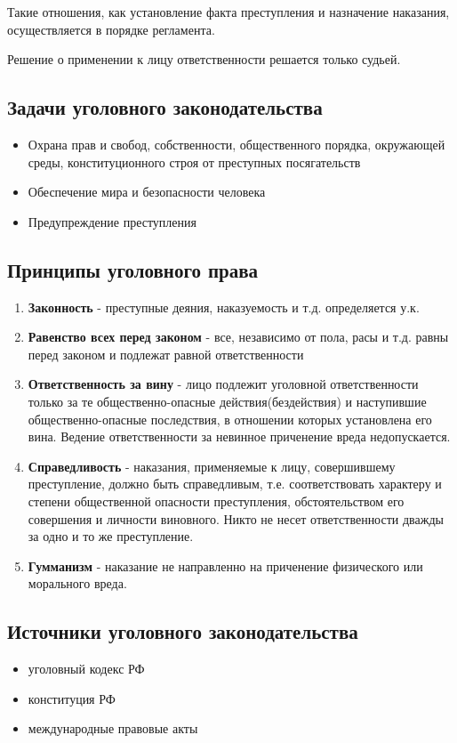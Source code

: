 \documentclass[a5paper,10pt]{article}
\begin{document}
		Такие отношения, как установление факта преступления и назначение наказания, осуществляется в порядке регламента.

		Решение о применении к лицу ответственности решается только судьей.

		\subsection{Задачи уголовного законодательства}
			\begin{itemize}
				\item Охрана прав и свобод, собственности, общественного порядка, окружающей среды, конституционного строя от преступных посягательств
				\item Обеспечение мира и безопасности человека
				\item Предупреждение преступления
			\end{itemize}

		\subsection{Принципы уголовного права}
			\begin{enumerate}
				\item \textbf{Законность} - преступные деяния, наказуемость и т.д. определяется у.к.
				\item \textbf{Равенство всех перед законом} - все, независимо от пола, расы и т.д. равны перед законом и подлежат равной ответственности
				\item \textbf{Ответственность за вину} - лицо подлежит уголовной ответственности только за те общественно-опасные действия(бездействия) и наступившие общественно-опасные последствия, в отношении которых установлена его вина. Ведение ответственности за невинное приченение вреда недопускается.
				\item \textbf{Справедливость} - наказания, применяемые к лицу, совершившему преступление, должно быть справедливым, т.е. соответствовать характеру и степени общественной опасности преступления, обстоятельством его совершения и личности виновного. Никто не несет ответственности дважды за одно и то же преступление.
				\item \textbf{Гумманизм} - наказание не направленно на приченение физического или морального вреда.
			\end{enumerate}

		\subsection{Источники уголовного законодательства}
			\begin{itemize}[itemsep=0pt]
				\item уголовный кодекс РФ
				\item конституция РФ
				\item международные правовые акты
			\end{itemize}
\end{document}
